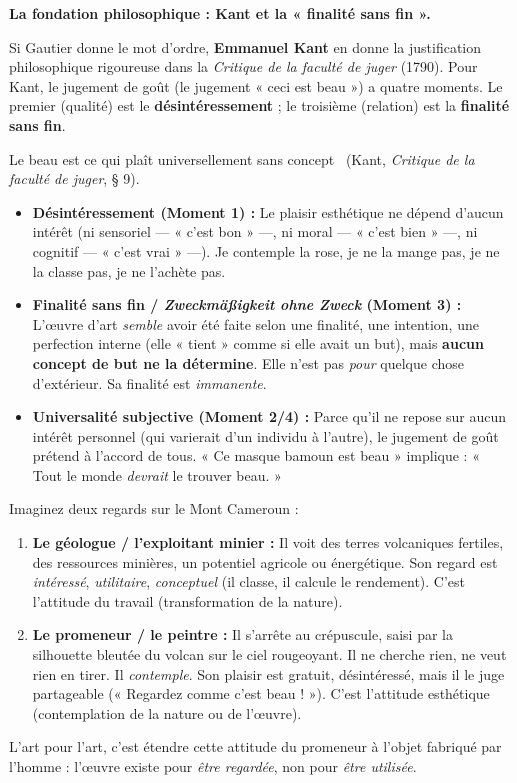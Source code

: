 \documentclass[11pt]{article}
\newcommand{\cle}[1]{{\popxbold\color{popdark}#1}}
\begin{document}
\textbf{La fondation philosophique : Kant et la « finalité sans fin ».}\par
Si Gautier donne le mot d'ordre, \textbf{Emmanuel Kant} en donne la justification philosophique rigoureuse dans la \emph{Critique de la faculté de juger} (1790). Pour Kant, le jugement de goût (le jugement « ceci est beau ») a quatre moments. Le premier (qualité) est le \textbf{désintéressement} ; le troisième (relation) est la \textbf{finalité sans fin}.

\begin{propriete}
\guillemotleft Le beau est ce qui plaît universellement sans concept \guillemotright\ (Kant, \emph{Critique de la faculté de juger}, § 9).
\begin{itemize}
    \item \textbf{Désintéressement (Moment 1) :} Le plaisir esthétique ne dépend d'aucun intérêt (ni sensoriel — « c'est bon » —, ni moral — « c'est bien » —, ni cognitif — « c'est vrai » —). Je contemple la rose, je ne la mange pas, je ne la classe pas, je ne l'achète pas.
    \item \textbf{Finalité sans fin / \emph{Zweckmäßigkeit ohne Zweck} (Moment 3) :} L'œuvre d'art \emph{semble} avoir été faite selon une finalité, une intention, une perfection interne (elle « tient » comme si elle avait un but), mais \textbf{aucun concept de but ne la détermine}. Elle n'est pas \emph{pour} quelque chose d'extérieur. Sa finalité est \emph{immanente}.
    \item \textbf{Universalité subjective (Moment 2/4) :} Parce qu'il ne repose sur aucun intérêt personnel (qui varierait d'un individu à l'autre), le jugement de goût prétend à l'accord de tous. « Ce masque bamoun est beau » implique : « Tout le monde \emph{devrait} le trouver beau. »
\end{itemize}
\end{propriete}

\begin{exemplebox}
Imaginez deux regards sur le Mont Cameroun :
\begin{enumerate}
    \item \textbf{Le géologue / l'exploitant minier :} Il voit des terres volcaniques fertiles, des ressources minières, un potentiel agricole ou énergétique. Son regard est \emph{intéressé}, \emph{utilitaire}, \emph{conceptuel} (il classe, il calcule le rendement). C'est l'attitude du \cle{travail} (transformation de la nature).
    \item \textbf{Le promeneur / le peintre :} Il s'arrête au crépuscule, saisi par la silhouette bleutée du volcan sur le ciel rougeoyant. Il ne cherche rien, ne veut rien en tirer. Il \emph{contemple}. Son plaisir est gratuit, désintéressé, mais il le juge partageable (« Regardez comme c'est beau ! »). C'est l'attitude \cle{esthétique} (contemplation de la nature ou de l'œuvre).
\end{enumerate}
L'art pour l'art, c'est étendre cette attitude du promeneur à l'objet fabriqué par l'homme : l'œuvre existe pour \emph{être regardée}, non pour \emph{être utilisée}.
\end{exemplebox}
\end{document}
